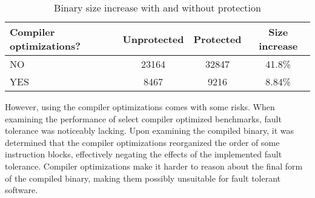 \begin{table}[!h]
\centering
\begin{tabular}{|l|c|c|c|}
\hline
\textbf{Compiler optimizations?} & \textbf{Unprotected} & \textbf{Protected} & \textbf{Size increase} \\
\hline
NO  & 23164 & 32847 & 41.8\% \\
YES & 8467 & 9216 & 8.84\% \\
\hline
\end{tabular}
\caption{Binary size increase with and without protection}
\end{table}

However, using the compiler optimizations comes with some risks. When examining the performance of select compiler optimized benchmarks, fault tolerance was noticeably lacking. Upon examining the compiled binary, it was determined that the compiler optimizations reorganized the order of some instruction blocks, effectively negating the effects of the implemented fault tolerance. Compiler optimizations make it harder to reason about the final form of the compiled binary, making them possibly unsuitable for fault tolerant software.
